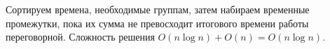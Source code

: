 \solutionSection

Сортируем времена, необходимые группам, затем набираем временные промежутки, пока их сумма не превосходит итогового времени работы переговорной.
Сложность решения $O(n\log{n}) + O(n) = O(n\log{n})$.

\codeExample

